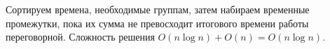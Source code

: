 \solutionSection

Сортируем времена, необходимые группам, затем набираем временные промежутки, пока их сумма не превосходит итогового времени работы переговорной.
Сложность решения $O(n\log{n}) + O(n) = O(n\log{n})$.

\codeExample

